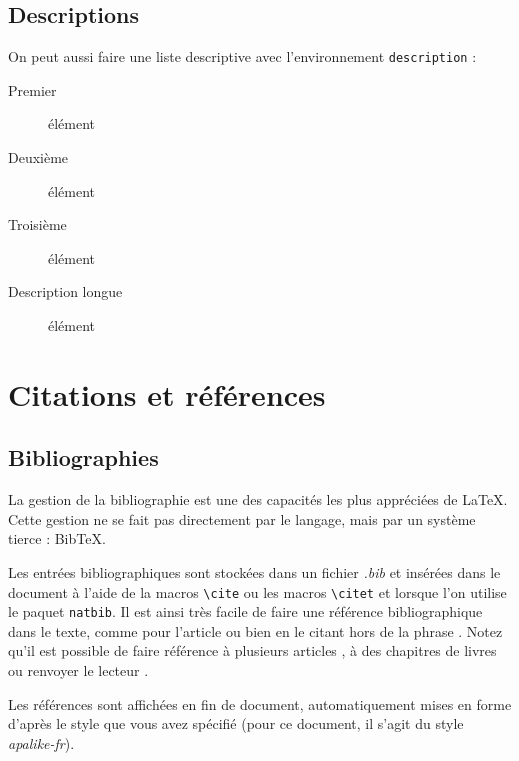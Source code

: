 \documentclass{rapport}
\def\Latex{\LaTeX\xspace}
\begin{document}
      \subsection{Descriptions}
        
        On peut aussi faire une liste descriptive avec l'environnement \verb|description| :
        
        \begin{description}
          \item[Premier] élément
          \item[Deuxième] élément
          \item[Troisième] élément
          \item[Description longue] élément
        \end{description}
        
    \section{Citations et références\label{sec:cite}}
      \subsection{Bibliographies}
        La gestion de la bibliographie est une des capacités les plus appréciées de \Latex. Cette gestion ne se fait pas directement par le langage, mais par un système tierce : Bib\TeX.
        
        Les entrées bibliographiques sont stockées dans un fichier \emph{.bib} et insérées dans le document à l'aide de la macros \verb+\cite+ ou les macros \verb|\citet| et \verb@\citep@ lorsque l'on utilise le paquet \verb-natbib-. Il est ainsi très facile de faire une référence bibliographique dans le texte, comme pour l'article \citet{Lamport1986} ou bien en le citant hors de la phrase \citep{Lamport1986}.  Notez qu'il est possible de faire référence à plusieurs articles \citep{GoossensMS1994, GoossensRM1997, Klockl2000, Dongen2012}, à des chapitres de livres \citep[chap 2]{Gratzer2014} ou renvoyer le lecteur \citep[voir ][]{Datta2017}.
        
        Les références sont affichées en fin de document, automatiquement mises en forme d'après le style que vous avez spécifié (pour ce document, il s'agit du style \emph{apalike-fr}). 
        
\end{document}
